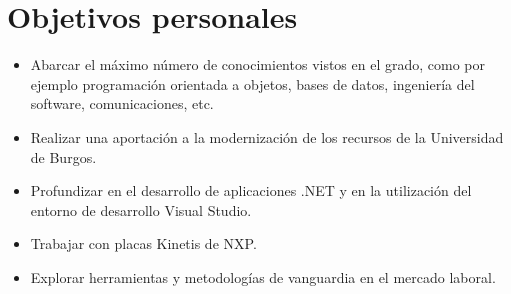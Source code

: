 \section{Objetivos personales}

\begin{itemize}
	\item Abarcar el máximo número de conocimientos vistos en el grado, como por ejemplo programación orientada a objetos, bases de datos, ingeniería del software, comunicaciones, etc.
	\item Realizar una aportación a la modernización de los recursos de la Universidad de Burgos.
	\item Profundizar en el desarrollo de aplicaciones .NET y en la utilización del entorno de desarrollo Visual Studio.
	\item Trabajar con placas Kinetis de NXP.
	\item Explorar herramientas y metodologías de vanguardia en el mercado laboral.
\end{itemize}